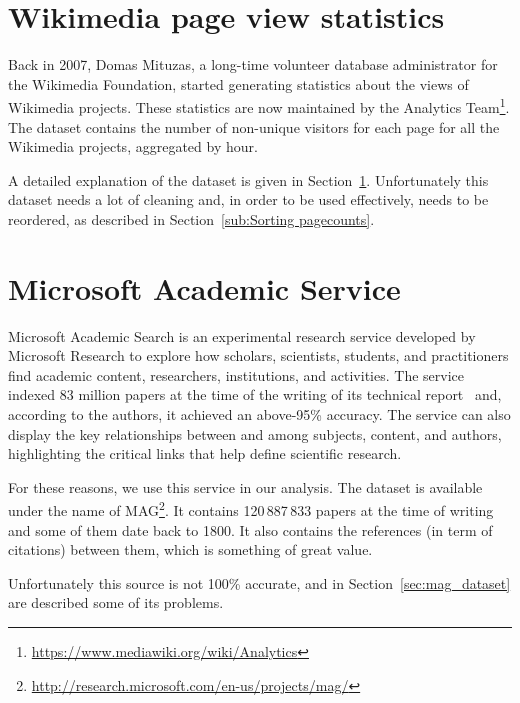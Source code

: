 
\section{Wikimedia page view statistics}
\label{sec:pagecounts}
Back in 2007, Domas Mituzas, a long-time volunteer database administrator for the Wikimedia Foundation, started generating statistics about the views of Wikimedia projects.
These statistics are now maintained by the Analytics Team\footnote{\url{https://www.mediawiki.org/wiki/Analytics}}.
The dataset contains the number of non-unique visitors for each page for all the Wikimedia projects, aggregated by hour.

A detailed explanation of the dataset is given in Section~\ref{sec:pagecounts}.
Unfortunately this dataset needs a lot of cleaning and, in order to be used effectively, needs to be reordered, as described in Section~\ref{sub:Sorting pagecounts}.

\section{Microsoft Academic Service}
\label{sec:mag}
Microsoft Academic Search is an experimental research service developed by Microsoft Research to explore how scholars, scientists, students, and practitioners find academic content, researchers, institutions, and activities.
The service indexed 83 million papers at the time of the writing of its technical report~\cite{Sinha2015} and, according to the authors, it achieved an above-95\% accuracy.
The service can also display the key relationships between and among subjects, content, and authors, highlighting the critical links that help define scientific research.

For these reasons, we use this service in our analysis.
The dataset is available under the name of \ac{MAG}\footnote{\url{http://research.microsoft.com/en-us/projects/mag/}}.
It contains 120\,887\,833 papers at the time of writing and some of them date back to 1800.
It also contains the references (in term of citations) between them, which is something of great value.

Unfortunately this source is not 100\% accurate, and in Section~\ref{sec:mag_dataset} are described some of its problems.



